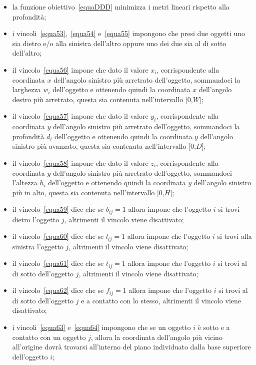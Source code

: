 \begin{itemize}
	\item la funzione obiettivo~\eqref{equaDDD} minimizza i metri lineari rispetto alla profondità;
	\item i vincoli~\eqref{equa53},~\eqref{equa54} e~\eqref{equa55} impongono che presi due oggetti uno sia dietro e/o alla sinistra dell'altro oppure uno dei due sia al di sotto dell'altro;
	\item il vincolo~\eqref{equa56} impone che dato il valore $x_i$, corrispondente alla coordinata $x$ dell'angolo sinistro più arretrato dell'oggetto, sommandoci la larghezza $w_i$ dell'oggetto e ottenendo quindi la coordinata $x$ dell'angolo destro più arretrato, questa sia contenuta nell'intervallo [0,$W$];
	\item il vincolo~\eqref{equa57} impone che dato il valore $y_i$, corrispondente alla coordinata $y$ dell'angolo sinistro più arretrato dell'oggetto, sommandoci la profondità $d_i$ dell'oggetto e ottenendo quindi la coordinata $y$ dell'angolo sinistro più avanzato, questa sia contenuta nell'intervallo [0,$D$];
	\item il vincolo~\eqref{equa58} impone che dato il valore $z_i$, corrispondente alla coordinata $y$ dell'angolo sinistro più arretrato dell'oggetto, sommandoci l'altezza $h_i$ dell'oggetto e ottenendo quindi la coordinata $y$ dell'angolo sinistro più in alto, questa sia contenuta nell'intervallo [0,$H$];
	\item il vincolo~\eqref{equa59} dice che se $b_{ij} = 1$ allora impone che l'oggetto $i$ si trovi dietro l'oggetto $j$, altrimenti il vincolo viene disattivato;
	\item il vincolo~\eqref{equa60} dice che se $l_{ij} = 1$ allora impone che l'oggetto $i$ si trovi alla sinistra l'oggetto $j$, altrimenti il vincolo viene disattivato;
	\item il vincolo~\eqref{equa61} dice che se $t_{ij} = 1$ allora impone che l'oggetto $i$ si trovi al di sotto dell'oggetto $j$, altrimenti il vincolo viene disattivato;
	\item il vincolo~\eqref{equa62} dice che se $f_{ij} = 1$ allora impone che l'oggetto $i$ si trovi al di sotto dell'oggetto $j$ e a contatto con lo stesso, altrimenti il vincolo viene disattivato;
	\item i vincoli~\eqref{equa63} e~\eqref{equa64} impongono che se un oggetto $i$ è sotto e a contatto con un oggetto $j$, allora la coordinata dell'angolo più vicino all'origine dovrà trovarsi all'interno del piano individuato dalla base superiore dell'oggetto $i$;

\end{itemize}
